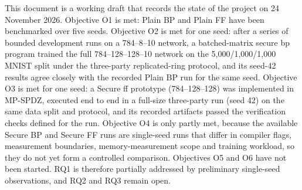 This document is a working draft that records the state of the project on 24 November 2026. Objective O1 is met: Plain BP and Plain FF have been benchmarked over five seeds. Objective O2 is met for one seed: after a series of bounded development runs on a 784--8--10 network, a batched-matrix secure \ac{bp} program trained the full 784--128--128--10 network on the 5{,}000/1{,}000/1{,}000 MNIST split under the three-party replicated-ring protocol, and its seed-42 results agree closely with the recorded Plain BP run for the same seed. Objective O3 is met for one seed: a Secure \ac{ff} prototype (784--128--128) was implemented in MP-SPDZ, executed end to end in a full-size three-party run (seed 42) on the same data split and protocol, and its recorded artifacts passed the verification checks defined for the run. Objective O4 is only partly met, because the available Secure BP and Secure FF runs are single-seed runs that differ in compiler flags, measurement boundaries, memory-measurement scope and training workload, so they do not yet form a controlled comparison. Objectives O5 and O6 have not been started. RQ1 is therefore partially addressed by preliminary single-seed observations, and RQ2 and RQ3 remain open.

